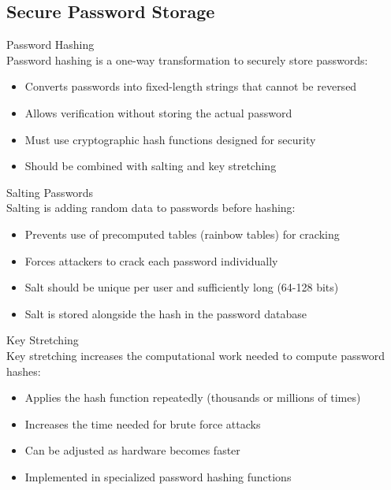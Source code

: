 \subsection{Secure Password Storage}

\begin{definition}{Password Hashing}\\
Password hashing is a one-way transformation to securely store passwords:
\begin{itemize}
    \item Converts passwords into fixed-length strings that cannot be reversed
    \item Allows verification without storing the actual password
    \item Must use cryptographic hash functions designed for security
    \item Should be combined with salting and key stretching
\end{itemize}
\end{definition}

\begin{concept}{Salting Passwords}\\
Salting is adding random data to passwords before hashing:
\begin{itemize}
    \item Prevents use of precomputed tables (rainbow tables) for cracking
    \item Forces attackers to crack each password individually
    \item Salt should be unique per user and sufficiently long (64-128 bits)
    \item Salt is stored alongside the hash in the password database
\end{itemize}
\end{concept}

\begin{concept}{Key Stretching}\\
Key stretching increases the computational work needed to compute password hashes:
\begin{itemize}
    \item Applies the hash function repeatedly (thousands or millions of times)
    \item Increases the time needed for brute force attacks
    \item Can be adjusted as hardware becomes faster
    \item Implemented in specialized password hashing functions
\end{itemize}
\end{concept}

